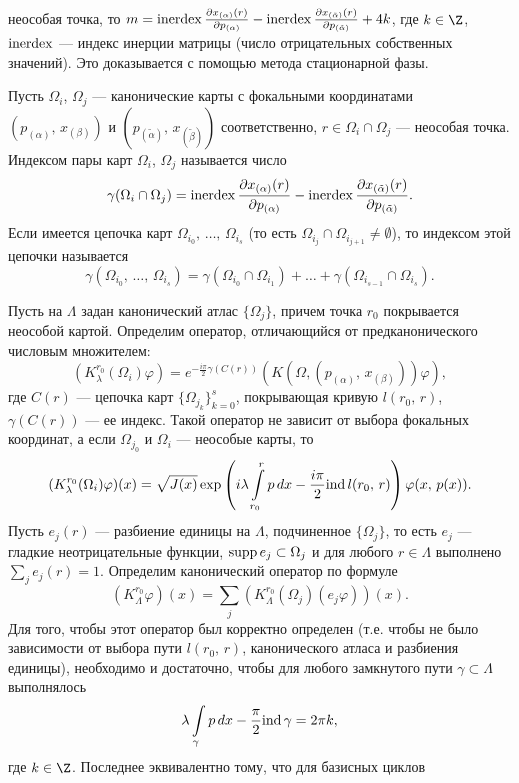\documentclass[a4paper
]{article}
\begin{document}
неособая точка, то $m={\rm inerdex}\, \frac{\partial x_{(\alpha)}(r)}{\partial p_{(\alpha)}}
-{\rm inerdex}\, \frac{\partial x_{(\tilde\alpha)}(r)}{\partial p_{(\tilde\alpha)}}+4k$,
где $k\in \Z$, ${\rm inerdex}$ --- индекс инерции матрицы (число отрицательных
собственных значений). Это доказывается с помощью метода стационарной фазы. \par
Пусть $\Omega_i$, $\Omega_j$ --- канонические карты с фокальными координатами
$(p_{(\alpha)}, \, x_{(\beta)})$ и $(p_{(\tilde\alpha)}, \, x_{(\tilde\beta)})$
соответственно, $r\in \Omega_i\cap \Omega_j$ --- неособая точка. Индексом пары
карт $\Omega_i$, $\Omega_j$ называется число $$\gamma(\Omega _i\cap \Omega _j)=
{\rm inerdex}\, \frac{\partial x_{(\alpha)}(r)}{\partial p_{(\alpha)}}
-{\rm inerdex}\, \frac{\partial x_{(\tilde\alpha)}(r)}{\partial p_{(\tilde\alpha)}}.$$
Если имеется цепочка карт $\Omega _{i_0}, \, \dots, \, \Omega _{i_s}$ (то есть $\Omega
_{i_j}\cap \Omega _{i_{j+1}}\ne \emptyset$), то индексом этой цепочки называется
$$\gamma (\Omega _{i_0}, \, \dots, \, \Omega _{i_s})=\gamma(\Omega _{i_0}\cap \Omega
_{i_1})+\dots+\gamma(\Omega _{i_{s-1}}\cap \Omega _{i_s}).$$ \par
Пусть на $\Lambda$ задан канонический атлас $\{\Omega _j\}$, причем точка $r_0$
покрывается неособой картой. Определим оператор, отличающийся
от предканонического числовым множителем: $$(K^{r_0}_\lambda(\Omega _i)\varphi)=
e^{-\frac{i\pi}{2}\gamma(C(r))}(K(\Omega, (p_{(\alpha)}, \, x_{(\beta)}))\varphi),$$
где $C(r)$ --- цепочка карт $\{\Omega _{j_k}\}_{k=0}^s$, покрывающая кривую
$l(r_0, \, r)$, $\gamma(C(r))$ --- ее индекс. Такой оператор не зависит от выбора
фокальных координат, а если $\Omega_{j_0}$ и $\Omega _i$ --- неособые карты, то
$$(K^{r_0}_\lambda(\Omega _i)\varphi)(x)=\sqrt{J(x)}\exp \left( i\lambda\int \limits
_{r_0}^r p\, dx-\frac{i\pi}{2}{\rm ind}\, l(r_0, \, r)\right)\varphi (x, \, p(x)).$$
Пусть $e_j(r)$ --- разбиение единицы на $\Lambda$, подчиненное $\{\Omega _j\}$, то есть
$e_j$ --- гладкие неотрицательные функции, ${\rm supp}\, e_j\subset \Omega _j$ и для
любого $r\in \Lambda$ выполнено $\sum \limits _j e_j(r)=1$. Определим канонический оператор
по формуле $$(K^{r_0}_{\Lambda} \varphi)(x)=\sum \limits _j (K^{r_0}_{\Lambda}(\Omega _j)
(e_j\varphi))(x).$$ Для того, чтобы этот оператор был корректно определен (т.е. чтобы
не было зависимости от выбора пути $l(r_0, \, r)$, канонического атласа и разбиения
единицы), необходимо и достаточно, чтобы для любого замкнутого пути $\gamma\subset
\Lambda$ выполнялось $$\lambda \int \limits _{\gamma}p\, dx-\frac{\pi}{2}{\rm ind}\,
\gamma =2\pi k,$$ где $k\in \Z$. Последнее эквивалентно тому, что для базисных циклов
\end{document}
